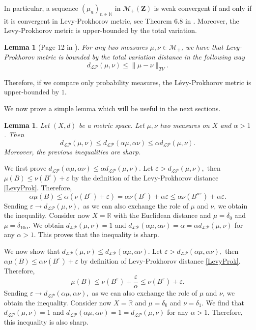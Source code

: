 \documentclass[11pt]{article}
\newtheorem{lemma}[theorem]{Lemma}
\def\R{\mathbb{R}}
\def\N{\mathbb{N}}
\newcommand{\Space}{\mathbf{Z}}
\newcommand{\Meas}{\mathcal{M}_+(\Space)}
\begin{document}
In particular, a sequence $(\mu_n)_{n\in \N}$ in $\Meas$ is weak convergent if and only if it is convergent in Levy-Prokhorov metric, see Theorem 6.8 in \cite{billingsley1968convergence}. Moreover, the Levy-Prokhorov metric is upper-bounded by the total variation.
\newline
\begin{lemma}[Page 12 in \cite{ComparingProbMeas}] \label{LemmBoundProhTotVar}
For any two measures $\mu,\nu \in \mathcal{M}_+$, we  have  that Levy-Prokhorov metric is bounded by the total variation distance in the following way $$d_{\mathcal{LP}}(\mu,\nu)\leq \|\mu-\nu\|_{TV}.$$
\end{lemma}

Therefore, if we compare only probability measures, the Lévy-Prokhorov metric is upper-bounded by $1.$

We now prove a simple lemma which will be useful in the next sections.

\begin{lemma}\label{LemmaIneqScalingProkhorov}
  Let $(X,d)$ be a metric space. Let $\mu,\nu$ two measures on $X$ and $\alpha >1$. Then 
    $$
    d_{\mathcal{LP}}(\mu,\nu)\leq d_{\mathcal{LP}}(\alpha\mu,\alpha\nu)\leq \alpha d_{\mathcal{LP}}(\mu,\nu).$$ Moreover, the previous inequalities are sharp.
\end{lemma}
\proof
We first prove $d_{\mathcal{LP}}(\alpha\mu,\alpha\nu)\leq \alpha d_{\mathcal{LP}}(\mu,\nu)$. Let $\varepsilon >d_{\mathcal{LP}}(\mu,\nu) ,$ then $\mu(B)\leq \nu (B^{\varepsilon})+\varepsilon$ by the definition of the Levy-Prokhorov distance \ref{LevyProk}. Therefore, $$
\alpha \mu(B)\leq \alpha (\nu(B^{\varepsilon})+\varepsilon)=
\alpha\nu(B^{\varepsilon})+ \alpha\varepsilon \leq \alpha\nu(B^{\alpha\varepsilon})+ \alpha\varepsilon. 
$$ 
Sending $\varepsilon\rightarrow d_{\mathcal{LP}}(\mu,\nu),$ as we can also exchange the role of $\mu $ and $\nu$, we obtain the inequality. Consider now $X=\R$ with the Euclidean distance and $\mu=\delta_0$ and $\mu=\delta_{10\alpha}$. We obtain $d_{\mathcal{LP}}(\mu,\nu)=1$ and $d_{\mathcal{LP}}(\alpha\mu,\alpha\nu)=\alpha=\alpha d_{\mathcal{LP}}(\mu,\nu)$ for any $\alpha>1.$ This proves that the inequality is sharp.



We now show that $d_{\mathcal{LP}}(\mu,\nu)\leq d_{\mathcal{LP}}(\alpha\mu,\alpha\nu)$.  Let $\varepsilon >d_{\mathcal{LP}}(\alpha\mu,\alpha\nu) ,$ then $\alpha\mu(B)\leq \alpha\nu (B^{\varepsilon})+\varepsilon$ by definition of Levy-Prokhorov distance \ref{LevyProk}. Therefore, $$
\mu(B)\leq  \nu(B^{\varepsilon})+\frac{\varepsilon}{\alpha} \leq \nu(B^{\varepsilon})+ \varepsilon. 
$$ 
Sending $\varepsilon\rightarrow d_{\mathcal{LP}}(\alpha\mu,\alpha\nu),$ as we can also exchange the role of $\mu $ and $\nu$, we obtain the inequality. Consider now $X=\R$ and $\mu=\delta_0$ and $\nu=\delta_{1}.$ We find that $d_{\mathcal{LP}}(\mu,\nu)=1$ and $d_{\mathcal{LP}}(\alpha\mu,\alpha\nu)=1= d_{\mathcal{LP}}(\mu,\nu)$ for any $\alpha>1.$ Therefore, this inequality is also sharp.
\endproof
\end{document}
